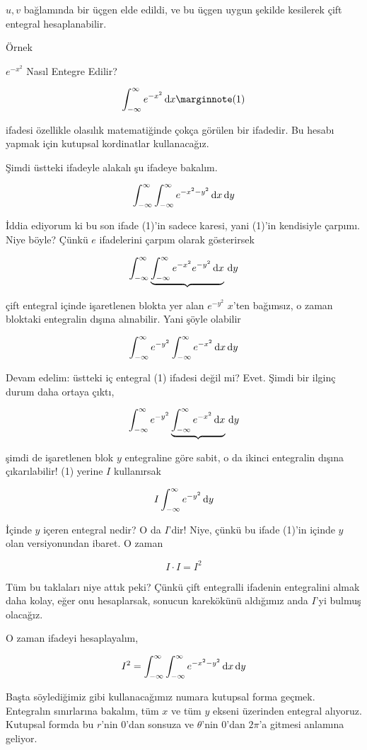 \documentclass[12pt,fleqn]{article}\usepackage{../../common}
\begin{document}
$u,v$ bağlamında bir üçgen elde edildi, ve bu üçgen uygun şekilde kesilerek çift
entegral hesaplanabilir.

Örnek

$e^{-x^2}$ Nasıl Entegre Edilir? 

$$ 
\int_{-\infty}^{\infty} e^{-x^2} \ud x 
\mlabel{1} 
$$

ifadesi özellikle olasılık matematiğinde çokça görülen bir ifadedir. Bu
hesabı yapmak için kutupsal kordinatlar kullanacağız. 

Şimdi üstteki ifadeyle alakalı şu ifadeye bakalım. 

$$ \int_{-\infty}^{\infty} \int_{-\infty}^{\infty} e^{-x^2-y^2} \,\mathrm{d} x \,\mathrm{d} y $$

İddia ediyorum ki bu son ifade (1)'in sadece karesi, yani (1)'in kendisiyle
çarpımı. Niye böyle? Çünkü $e$ ifadelerini çarpım olarak gösterirsek

$$
\int_{-\infty}^{\infty} \underbrace{\int_{-\infty}^{\infty} e^{-x^2} e^{-y^2} 
\,\mathrm{d} x} \,\mathrm{d} y
$$

çift entegral içinde işaretlenen blokta yer alan $e^{-y^2}$ $x$'ten
bağımsız, o zaman bloktaki entegralin dışına alınabilir. Yani şöyle olabilir

$$
\int_{-\infty}^{\infty} e^{-y^2} \int_{-\infty}^{\infty} e^{-x^2} \,\mathrm{d} x \,\mathrm{d} y
$$

Devam edelim: üstteki iç entegral (1) ifadesi değil mi? Evet. Şimdi bir
ilginç durum daha ortaya çıktı, 

$$
\int_{-\infty}^{\infty}  e^{-y^2} 
\underbrace{\int_{-\infty}^{\infty} e^{-x^2} \,\mathrm{d} x} \,\mathrm{d} y
$$

şimdi de işaretlenen blok $y$ entegraline göre sabit, o da ikinci entegralin
dışına çıkarılabilir! (1) yerine $I$ kullanırsak

$$ I \int_{-\infty}^{\infty}  e^{-y^2} \,\mathrm{d} y $$

İçinde $y$ içeren entegral nedir? O da $I$'dir! Niye, çünkü bu ifade 
(1)'in içinde $y$ olan versiyonundan ibaret. O zaman 

$$ I \cdot I = I^2 $$

Tüm bu taklaları niye attık peki? Çünkü çift entegralli ifadenin entegralini
almak daha kolay, eğer onu hesaplarsak, sonucun karekökünü aldığımız anda $I$'yi
bulmuş olacağız.

O zaman ifadeyi hesaplayalım, 

$$
I^2 = \int_{-\infty}^{\infty} \int_{-\infty}^{\infty} e^{-x^2-y^2} \,\mathrm{d} x \,\mathrm{d} y
$$

Başta söylediğimiz gibi kullanacağımız numara kutupsal forma geçmek. Entegralın
sınırlarına bakalım, tüm $x$ ve tüm $y$ ekseni üzerinden entegral
alıyoruz. Kutupsal formda bu $r$'nin 0'dan sonsuza ve $\theta$'nin 0'dan
$2\pi$'a gitmesi anlamına geliyor.
\end{document}
